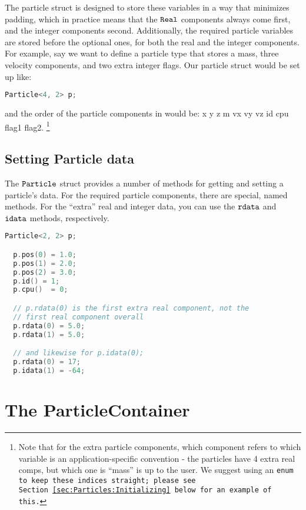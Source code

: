 The particle struct is designed to store these variables in a way that minimizes padding, which in practice means that the $\tt{Real}$ components always come first, and the integer
components second. Additionally, the required particle variables are stored before the optional ones, for both the real and the integer components. For example, say we want to define
a particle type that stores a mass, three velocity components, and two extra integer flags. Our particle struct would be set up like:

\begin{lstlisting}[language=cpp]
  Particle<4, 2> p;
\end{lstlisting}

and the order of the particle components in would be: x y z m vx vy vz id cpu flag1 flag2. \footnote{Note that for the extra particle components, which component refers to which
variable is an application-specific convention - the particles have 4 extra real comps, but which one is ``mass'' is up to the user. We suggest using an \tt{enum} to keep these indices straight; please see Section~\ref{sec:Particles:Initializing} below for an example of this.} 

\subsection{Setting Particle data}

The $\tt{Particle}$ struct provides a number of methods for getting and setting a particle's data. For the required particle components, there are special, named methods. For the 
``extra'' real and integer data, you can use the $\tt{rdata}$ and $\tt{idata}$ methods, respectively. 

\begin{lstlisting}[language=cpp]
  Particle<2, 2> p;

  p.pos(0) = 1.0;
  p.pos(1) = 2.0;
  p.pos(2) = 3.0;
  p.id() = 1;
  p.cpu()  = 0;

  // p.rdata(0) is the first extra real component, not the 
  // first real component overall
  p.rdata(0) = 5.0;
  p.rdata(1) = 5.0;

  // and likewise for p.idata(0);
  p.rdata(0) = 17;
  p.idata(1) = -64;  
\end{lstlisting}

\section{The ParticleContainer}
\label{sec:Particles:ParticleContainer}
 
